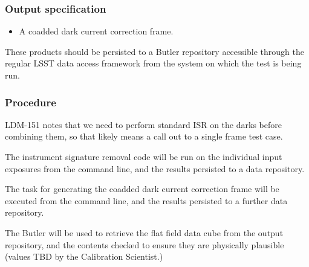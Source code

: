 \subsubsection{Output specification}

\begin{itemize}

  \item{A coadded dark current correction frame.}

\end{itemize}

These products should be persisted to a Butler repository accessible through
the regular LSST data access framework from the system on which the test is
being run.

\subsubsection{Procedure}

\begin{note}
LDM-151 notes that we need to perform standard ISR on the darks before
combining them, so that likely means a call out to a single frame test case.
\end{note}

The instrument signature removal code will be run on the individual input
exposures from the command line, and the results persisted to a data
repository.

The task for generating the coadded dark current correction frame will be
executed from the command line, and the results persisted to a further data
repository.

The Butler will be used to retrieve the flat field data cube from the output
repository, and the contents checked to ensure they are physically plausible
(values TBD by the Calibration Scientist.)
